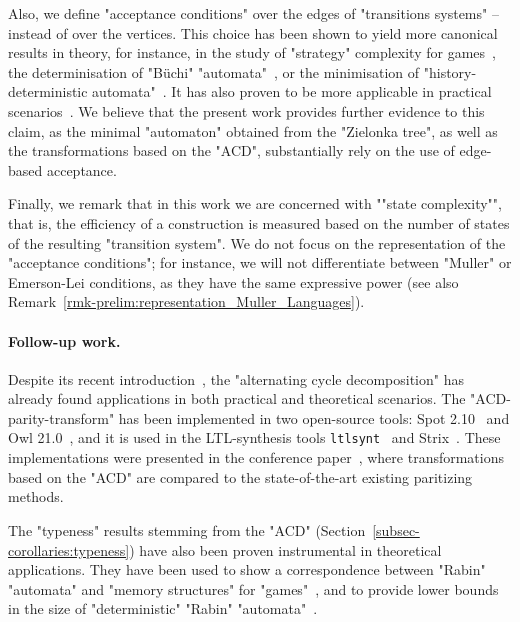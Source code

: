 \documentclass[10pt,a4paper]{amsart}
\begin{document}
Also, we define "acceptance conditions" over the edges of "transitions systems" -- instead of over the vertices. This choice has been shown to yield more canonical results in theory, for instance, in the study of "strategy" complexity for games~\cite{BCRV22HalfPosBuchi,Casares2021Chromatic,CN06,Zielonka1998infinite}, the determinisation of "B\"uchi" "automata"~\cite{Colcombetz2009tight,Varghese14Determinising}, or the minimisation of "history-deterministic automata"~\cite{AK22MinimizingGFG,EhlersSchewe22NaturalColors}. It has also proven to be more applicable in practical scenarios~\cite{Spot2.10CAV22,GiannakopoulouLerda2002Transitions}.  We believe that the present work provides further evidence to this claim, as the minimal "automaton" obtained from the "Zielonka tree", as well as the transformations based on the "ACD", substantially rely on the use of edge-based acceptance. 

\AP Finally, we remark that in this work we are concerned with ""state complexity"", that is, the efficiency of a construction is measured based on the number of states of the resulting "transition system". We do not focus on the representation of the "acceptance conditions"; for instance, we will not differentiate between "Muller" or Emerson-Lei conditions, as they have the same expressive power (see also Remark~\ref{rmk-prelim:representation_Muller_Languages}).




\paragraph*{Follow-up work.}

Despite its recent introduction~\cite{CCF21Optimal}, the "alternating cycle decomposition" has already found applications in both practical and theoretical scenarios.
The "ACD-parity-transform" has been implemented in two open-source tools: Spot 2.10~\cite{Spot2.10CAV22} and Owl 21.0~\cite{KMS18Owl}, and it is used in the LTL-synthesis tools \texttt{ltlsynt}~\cite{Spot2.10CAV22} and Strix~\cite{MS21ModernisingStrix}. These implementations were presented in the conference paper~\cite{CDMRS22Tacas}, where transformations based on the "ACD" are compared to the state-of-the-art existing paritizing methods.

The "typeness" results stemming from the "ACD" (Section~\ref{subsec-corollaries:typeness}) have also been proven instrumental in theoretical applications. They have been used to show a correspondence between "Rabin" "automata" and "memory structures" for "games"~\cite{Casares2021Chromatic}, and to provide lower bounds in the size of "deterministic" "Rabin" "automata"~\cite{CCL22SizeGFG}.
\end{document}
